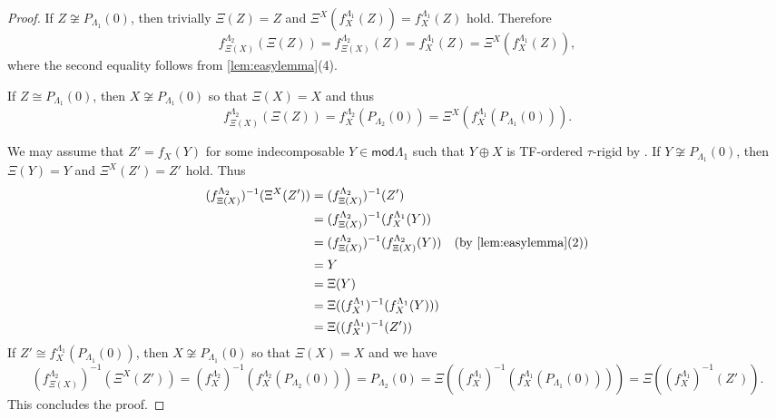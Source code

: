 \documentclass[11pt]{amsart}
\newcommand{\mods}{\mathsf{mod}}
\theoremstyle{definition}
\begin{document}
\begin{proof}
    If $Z \not \cong P_{\Lambda_1}(0)$, then trivially $\Xi(Z)=Z$ and $\Xi^X(f_X^{\Lambda_1}(Z)) = f_X^{\Lambda_1}(Z)$ hold. Therefore 
    \[ f_{\Xi(X)}^{\Lambda_2}(\Xi(Z)) = f_{\Xi(X)}^{\Lambda_2}(Z) = f_X^{\Lambda_1}(Z) = \Xi^X(f_X^{\Lambda_1}(Z)),\]
    where the second equality follows from \cref{lem:easylemma}(4).

    If $Z \cong P_{\Lambda_1}(0)$, then $X \not \cong P_{\Lambda_1}(0)$ so that $\Xi(X)=X$ and thus
    \[ f_{\Xi(X)}^{\Lambda_2}(\Xi(Z)) = f_X^{\Lambda_2}(P_{\Lambda_2}(0)) = \Xi^X(f_X^{\Lambda_1}(P_{\Lambda_1}(0))). \]

    We may assume that $Z' = f_X(Y)$ for some indecomposable $Y \in \mods \Lambda_1$ such that $Y \oplus X$ is TF-ordered $\tau$-rigid by \cite[Prop. 4.5]{tauexceptional_buanmarsh}. If $Y \not \cong P_{\Lambda_1}(0)$, then $\Xi(Y) = Y$ and $\Xi^X(Z') = Z'$ hold. Thus
    \begin{align*} (f_{\Xi(X)}^{\Lambda_2})^{-1}( \Xi^X(Z')) & = ( f_{\Xi(X)}^{\Lambda_2})^{-1}(Z') \\
    & = ( f_{\Xi(X)}^{\Lambda_2})^{-1}(f_X^{\Lambda_1}(Y)) \\
    &= (f_{\Xi(X)}^{\Lambda_2})^{-1} (f_{\Xi(X)}^{\Lambda_2}(Y))  & \text{(by \cref{lem:easylemma}(2))}\\
    &= Y \\
    & = \Xi(Y) \\
    &= \Xi((f_{X}^{\Lambda_1})^{-1}( f_X^{\Lambda_1}(Y))) \\
    &= \Xi((f_X^{\Lambda_1})^{-1}(Z'))\end{align*}
    If $Z' \cong f_X^{\Lambda_1} (P_{\Lambda_1}(0))$, then $X \not \cong P_{\Lambda_1}(0)$ so that $\Xi(X)=X$ and we have
    \[ (f_{\Xi(X)}^{\Lambda_2})^{-1} ( \Xi^X(Z')) = (f_X^{\Lambda_2})^{-1} ( f_X^{\Lambda_2}(P_{\Lambda_2}(0))) = P_{\Lambda_2}(0) = \Xi( (f_X^{\Lambda_1})^{-1} (f_X^{\Lambda_1}(P_{\Lambda_1}(0)))) = \Xi((f_X^{\Lambda_1})^{-1}(Z')). \]
    This concludes the proof.
\end{proof}
\end{document}
